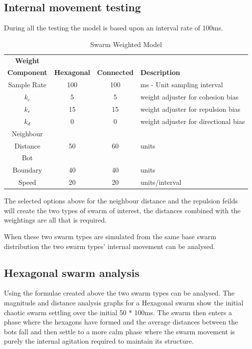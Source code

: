 \documentclass[10pt,journal,letterpaper,twoside]{IEEEtran}
\newcommand{\swarmA}{Hexagonal}
\newcommand{\swarmB}{Connected}
\newcommand{\stability}{internal movement}
\newcommand{\Stability}{Internal movement}
\begin{document}
\subsection{\Stability{} testing}\label{Section:StabilityTesting}

During all the testing the model is based upon an interval rate of 100ms.

\begin{center}
\begin{table}[H]
\begin{tabular}{ c | c | c | p{3cm}}
\bf Weight \\\bf Component & \bf \swarmA{} & \bf \swarmB{} & \bf Description \\ \hline
Sample Rate & 100 & 100 & ms - Unit sampling interval\\  \hline
$k_c$ & 5 & 5 & weight adjuster for cohesion bias\\  \hline
$k_r$ & 15 & 15 & weight adjuster for repulsion  bias\\  \hline
$k_d$ & 0 & 0 & weight adjuster for directional bias\\  \hline
Neighbour \\ Distance & 50 & 60 &  units\\  \hline
Bot \\ Boundary & 40 & 40 & units\\  \hline
Speed & 20 & 20 & units/interval\\  \hline
\end{tabular}
\caption{Swarm Weighted Model} \label{tab:Physics2}
\end{table}
\end{center}

The selected options above for the neighbour distance and the repulsion feilds will create the two types of swarm of interest, the distances combined with the weightings are all that is required.

When these two swarm types are simulated from the same base swarm distribution the two swarm types' \stability{} can be analysed.


\subsection{\swarmA{} swarm analysis}

Using the formulae created above the two swarm types can be analysed. The magnitude and distance analysis graphs for a \swarmA{} swarm show the initial chaotic swarm settling over the initial 50 * 100ms. The swarm then enters a phase where the hexagons have formed and the average distances between the bots fall and then settle to a more calm phase where the swarm movement is purely the internal agitation required to maintain its structure.
\end{document}
